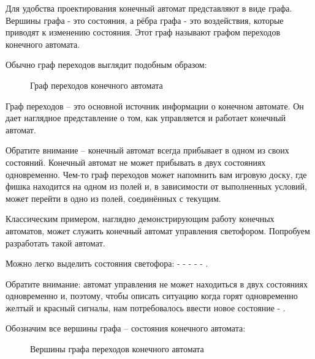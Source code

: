 \par{Для удобства проектирования конечный автомат представляют в виде графа. Вершины графа - это состояния, а рёбра графа - это воздействия, которые приводят к изменению состояния. Этот граф называют графом переходов конечного автомата.}

\par{Обычно граф переходов выглядит подобным образом:}

\begin{figure}[H]
  \centering
  \def\svgwidth{\columnwidth}
  
  \caption{Граф переходов конечного автомата}
\end{figure}

\par{Граф переходов – это основной источник информации о конечном автомате. Он дает наглядное представление о том, как управляется и работает конечный автомат.}

\par{Обратите внимание – конечный автомат всегда прибывает в одном из своих состояний. Конечный автомат не может прибывать в двух состояниях одновременно.  Чем-то граф переходов может напомнить вам игровую доску, где фишка находится на одном из полей и, в зависимости от выполненных условий, может перейти в одно из полей, соединённых с текущим.}

\par{Классическим примером, наглядно демонстрирующим работу конечных автоматов, может служить конечный автомат управления светофором. Попробуем разработать такой автомат.}

\par{Можно легко выделить состояния светофора:  -  -  -  -  - .}

\par{Обратите внимание: автомат управления не может находиться в двух состояниях одновременно и, поэтому, чтобы описать ситуацию когда горят одновременно желтый и красный сигналы, нам потребовалось ввести новое состояние - .}

\par{Обозначим все вершины графа – состояния конечного автомата:}

\begin{figure}[H]
  \centering
  \def\svgwidth{\columnwidth}
  
  \caption{Вершины графа переходов конечного автомата}
\end{figure}

